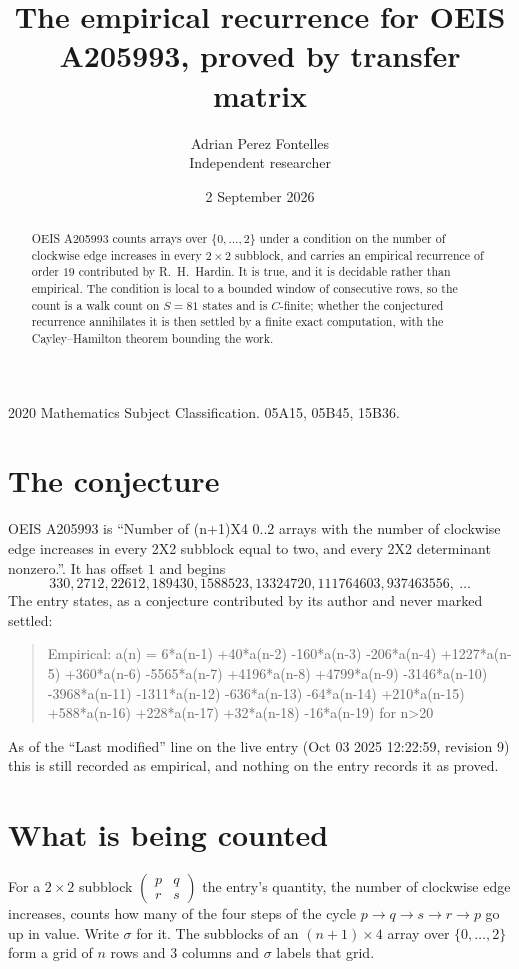 \documentclass[11pt,a4paper]{article}
\title{The empirical recurrence for OEIS A205993, proved by transfer matrix}
\author{Adrian Perez Fontelles\\ \small Independent researcher}
\date{2 September 2026}
\theoremstyle{plain}
\theoremstyle{definition}
\begin{document}
\maketitle

\begin{abstract}
OEIS A205993 counts arrays over $\{0,\dots,2\}$ under a condition on the number of clockwise edge increases
in every $2\times2$ subblock, and carries an empirical recurrence of order $19$ contributed by
R.~H.~Hardin. It is true, and it is decidable rather than empirical. The condition is local to
a bounded window of consecutive rows, so the count is a walk count on $S=81$ states and is
$C$-finite; whether the conjectured recurrence annihilates it is then settled by a finite exact
computation, with the Cayley--Hamilton theorem bounding the work.
\end{abstract}

\noindent\small 2020 Mathematics Subject Classification. 05A15, 05B45, 15B36.\normalsize

\section{The conjecture}

OEIS A205993 is ``Number of (n+1)X4 0..2 arrays with the number of clockwise edge increases in every 2X2 subblock equal to two, and every 2X2 determinant nonzero.''. It has offset $1$ and begins
\[
330, 2712, 22612, 189430, 1588523, 13324720, 111764603, 937463556,\ \dots
\]
The entry states, as a conjecture contributed by its author and never marked settled:
\begin{quote}
Empirical: a(n) = 6*a(n-1) +40*a(n-2) -160*a(n-3) -206*a(n-4) +1227*a(n-5) +360*a(n-6) -5565*a(n-7) +4196*a(n-8) +4799*a(n-9) -3146*a(n-10) -3968*a(n-11) -1311*a(n-12) -636*a(n-13) -64*a(n-14) +210*a(n-15) +588*a(n-16) +228*a(n-17) +32*a(n-18) -16*a(n-19) for n>20
\end{quote}
As of the ``Last modified'' line on the live entry (Oct 03 2025 12:22:59, revision 9) this is still
recorded as empirical, and nothing on the entry records it as proved.

\section{What is being counted}

For a $2\times2$ subblock $\begin{pmatrix}p&q\\r&s\end{pmatrix}$ the
entry's quantity, the number of clockwise edge increases, counts how many of the four steps of the cycle $p\to q\to s\to r\to p$ go up in value. Write $\sigma$ for it. The subblocks of an
$(n+1)\times4$ array over $\{0,\dots,2\}$ form a grid of $n$ rows and $3$
columns and $\sigma$ labels that grid.
\end{document}
